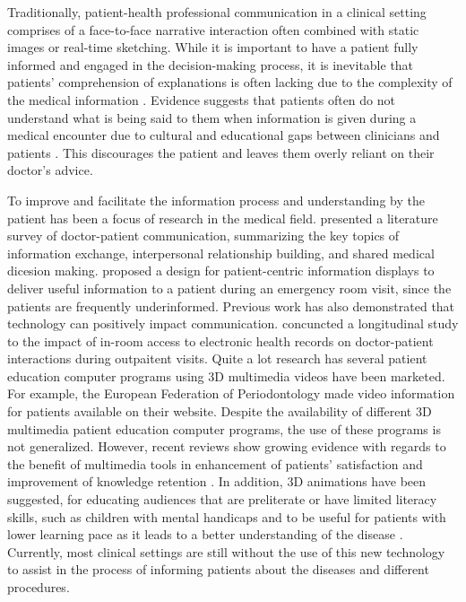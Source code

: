 Traditionally, patient-health professional communication in a clinical setting comprises of a face-to-face narrative interaction often combined with static images or real-time sketching. While it is important to have a patient fully informed and engaged in the decision-making process, it is inevitable that patients' comprehension of explanations is often lacking due to the complexity of the medical information \cite{Cleeren2014}. Evidence suggests that patients often do not understand what is being said to them when information is given during a medical encounter due to cultural and educational gaps between clinicians and patients \cite{Beranova2007}. This discourages the patient and leaves them overly reliant on their doctor's advice.

To improve and facilitate the information process and understanding by the patient has been a focus of research in the medical field. 
\citet{Ong1995} presented a literature survey of doctor-patient communication, summarizing the key topics of information exchange, interpersonal relationship building, and shared medical dicesion making. \citet{Wilcox2010a} proposed a design for patient-centric information displays to deliver useful information to a patient during an emergency room visit, since the patients are frequently underinformed. Previous work has also demonstrated that technology can positively impact communication. \citet{Hsu2005} concuncted a longitudinal study to the impact of in-room access to electronic health records on doctor-patient interactions during outpaitent visits.
Quite a lot research has several patient education computer programs using 3D multimedia videos have been marketed. For example, the European Federation of Periodontology made video information for patients available on their website. Despite the availability of different 3D multimedia patient education computer programs, the use of these programs is not generalized. 
However, recent reviews show growing evidence with regards to the benefit of multimedia tools in enhancement of patients' satisfaction and improvement of knowledge retention \cite{Beranova2007}. In addition, 3D animations have been suggested, for educating audiences that are preliterate or have limited literacy skills, such as children with mental handicaps \cite{T.1997} and to be useful for patients with lower learning pace as it leads to a better understanding of the disease \cite{Jimison1998}. Currently, most clinical settings are still without the use of this new technology to assist in the process of informing patients about the diseases and different procedures. 
